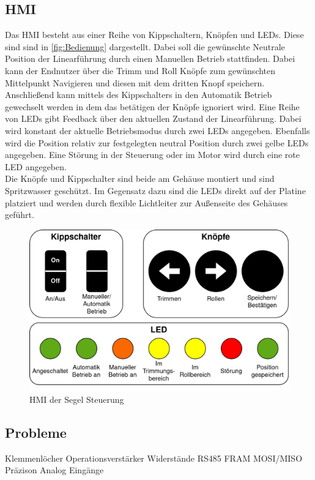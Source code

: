 \subsection{\ac{HMI}}
Das HMI besteht aus einer Reihe von Kippschaltern, Knöpfen und LEDs. Diese sind sind in \autoref{fig:Bedienung} dargestellt. Dabei soll die gewünschte Neutrale Position der Linearführung durch einen Manuellen Betrieb stattfinden. Dabei kann der Endnutzer über die Trimm und Roll Knöpfe zum gewünschten Mittelpunkt Navigieren und diesen mit dem dritten Knopf speichern. Anschließend kann mittels des Kippschalters in den Automatik Betrieb gewechselt werden in dem das betätigen der Knöpfe ignoriert wird.
Eine Reihe von LEDs gibt Feedback über den aktuellen Zustand der Linearführung. Dabei wird konstant der aktuelle Betriebsmodus durch zwei LEDs angegeben. Ebenfalls wird die Position relativ zur festgelegten neutral Position durch zwei gelbe LEDs angegeben. Eine Störung in der Steuerung oder im Motor wird durch eine rote LED angegeben.\\
Die Knöpfe und Kippschalter sind beide am Gehäuse montiert und sind Spritzwasser geschützt. Im Gegensatz dazu sind die LEDs direkt auf der Platine platziert und werden durch flexible Lichtleiter zur Außenseite des Gehäuses geführt.
\begin{figure}[H]
	\centering
	\includegraphics[width=1.0\textwidth]{images/Hardware/Bedienung.drawio.png}
	\caption{HMI der Segel Steuerung}
	\label{fig:Bedienung}
\end{figure}

\subsection{Probleme}
Klemmenlöcher
Operationsverstärker
Widerstände RS485
FRAM MOSI/MISO
Präzison Analog Eingänge